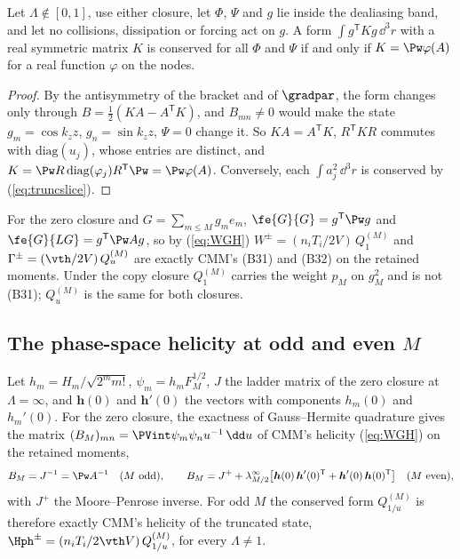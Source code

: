 \begin{proposition}
Let $\Lambda\notin[0,1]$, use either closure, let $\Phi$, $\Psi$ and $g$ lie inside the dealiasing band, and let no collisions, dissipation or forcing act on $g$. A form $\int g^{\mathsf T}Kg\,\dd^3r$ with a real symmetric matrix $K$ is conserved for all $\Phi$ and $\Psi$ if and only if $K=\Pw\varphi(A)$ for a real function $\varphi$ on the nodes.
\end{proposition}

\begin{proof}
By the antisymmetry of the bracket and of $\gradpar$, the form changes only through $B=\frac12(KA-A^{\mathsf T}K)$, and $B_{mn}\neq0$ would make the state $g_m=\cos k_zz$, $g_n=\sin k_zz$, $\Psi=0$ change it. So $KA=A^{\mathsf T}K$, $R^{\mathsf T}KR$ commutes with $\mathrm{diag}(u_j)$, whose entries are distinct, and $K=\Pw R\,\mathrm{diag}(\varphi_j)R^{\mathsf T}\Pw=\Pw\varphi(A)$. Conversely, each $\int a_j^2\,\dd^3r$ is conserved by (\ref{eq:truncslice}).
\end{proof}

For the zero closure and $G=\sum_{m\le M}g_me_m$, $\fe{G}{G}=g^{\mathsf T}\Pw g$ and $\fe{G}{LG}=g^{\mathsf T}\Pw Ag$, so by (\ref{eq:WGH}) $W^\pm=(n_iT_i/2V)\,Q^{(M)}_1$ and $\Gamma^\pm=(\vth/2V)\,Q^{(M)}_u$ are exactly CMM's (B31) and (B32) on the retained moments. Under the copy closure $Q^{(M)}_1$ carries the weight $p_M$ on $g_M^2$ and is not (B31); $Q^{(M)}_u$ is the same for both closures.

\subsection{The phase-space helicity at odd and even \texorpdfstring{$M$}{M}}

Let $h_m=H_m/\sqrt{2^mm!}$, $\psi_m=h_mF_M^{1/2}$, $J$ the ladder matrix of the zero closure at $\Lambda=\infty$, and $\boldsymbol h(0)$ and $\boldsymbol h'(0)$ the vectors with components $h_m(0)$ and $h_m'(0)$. For the zero closure, the exactness of Gauss--Hermite quadrature gives the matrix $(B_M)_{mn}=\PVint\psi_m\psi_nu^{-1}\,\dd u$ of CMM's helicity (\ref{eq:WGH}) on the retained moments,
\begin{equation}\label{eq:Hoddeven}
  B_M=J^{-1}=\Pw A^{-1}\quad(M\ \text{odd}),\qquad
  B_M=J^{+}+\lambda^\infty_{M/2}\big[\boldsymbol h(0)\,\boldsymbol h'(0)^{\mathsf T}+\boldsymbol h'(0)\,\boldsymbol h(0)^{\mathsf T}\big]\quad(M\ \text{even}),
\end{equation}
with $J^+$ the Moore--Penrose inverse. For odd $M$ the conserved form $Q^{(M)}_{1/u}$ is therefore exactly CMM's helicity of the truncated state, $\Hph^\pm=(n_iT_i/2\vth V)\,Q^{(M)}_{1/u}$, for every $\Lambda\neq1$.

